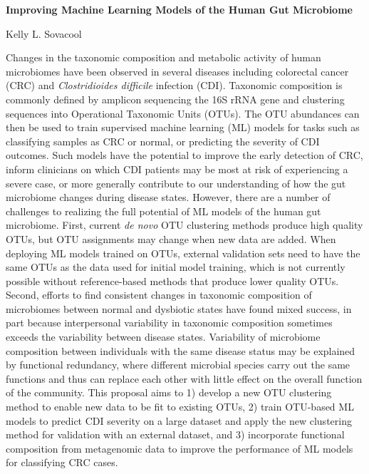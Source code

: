 \documentclass[11pt]{article}
\begin{document}
\sloppy
\begin{center}
\large{\textbf{
    Improving Machine Learning Models of the Human Gut Microbiome
}}

\vspace{11pt}

\small{
    Kelly L. Sovacool
}
\end{center}

Changes in the taxonomic composition and metabolic activity of human microbiomes
have been observed in several diseases including colorectal cancer (CRC) and
\textit{Clostridioides difficile} infection (CDI).
Taxonomic composition is commonly defined by amplicon sequencing the 16S rRNA
gene and clustering sequences into Operational Taxonomic Units (OTUs).
The OTU abundances can then be used to train supervised machine learning (ML)
models for tasks such as classifying samples as CRC or normal, or predicting the
severity of CDI outcomes.
Such models have the potential to improve the early detection of CRC, inform
clinicians on which CDI patients may be most at risk of experiencing a severe
case, or more generally contribute to our understanding of how the gut
microbiome changes during disease states.
However, there are a number of challenges to realizing the full 
potential of ML models of the human gut microbiome.
First, current \textit{de novo} OTU clustering methods produce high quality
OTUs, but OTU assignments may change when new data are added.
When deploying ML models trained on OTUs, external validation sets need to have
the same OTUs as the data used for initial model training, which is not
currently possible without reference-based methods that produce lower quality
OTUs.
Second, efforts to find consistent changes in taxonomic composition of
microbiomes between normal and dysbiotic states have found mixed success, in
part because interpersonal variability in taxonomic composition sometimes
exceeds the variability between disease states.
Variability of microbiome composition between individuals with the same disease
status may be explained by functional redundancy, where different microbial
species carry out the same functions and thus can replace each other with little
effect on the overall function of the community.
This proposal aims to 
1) develop a new OTU clustering method to enable new data to be fit to existing
OTUs, 
2) train OTU-based ML models to predict CDI severity on a large dataset and
apply the new clustering method for validation with an external dataset, and 
3) incorporate functional composition from metagenomic data to improve the
performance of ML models for classifying CRC cases.
\end{document}
